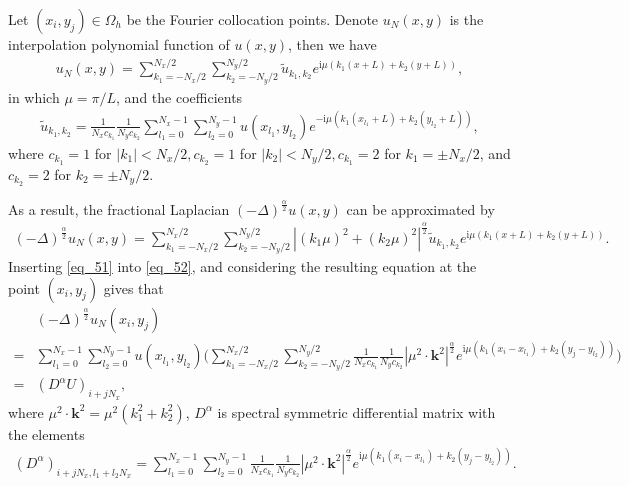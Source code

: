 \documentclass[preprint,compress,3p,10pt,fleqn]{elsarticle}
\numberwithin{equation}{section}
\begin{document}
Let $\left(x_{i}, y_{j}\right) \in \Omega_{h}$ be the Fourier collocation points. Denote $u_{N}(x, y)$ is the interpolation polynomial function of $u(x, y)$, then we have
\begin{align}\label{eq_50}
u_{N}(x, y)=\sum_{k_{1}=-N_{x} / 2}^{N_{x} / 2} \sum_{k_{2}=-N_{y} / 2}^{N_{y} / 2} \tilde{u}_{k_{1}, k_{2}} e^{\mathrm{i}\mu\left( k_{1} (x+L)+k_{2}(y+L)\right)},
\end{align}
in which $\mu={\pi}/{L}$, and the coefficients
\begin{align}\label{eq_51}
\tilde{u}_{k_{1}, k_{2}}=\frac{1}{N_{x} c_{k_{1}}} \frac{1}{N_{y} c_{k_{2}}} \sum_{l_1=0}^{N_{x}-1} \sum_{l_2=0}^{N_{y}-1} u(x_{l_1}, y_{l_2}) e^{-\mathrm{i}\mu\left( k_{1}(x_{l_1}+L)+k_{2}(y_{l_2}+L)\right)},
\end{align}
where $c_{k_{1}}=1$ for $\left|k_{1}\right|<N_{x}/2, c_{k_{2}}=1$ for $\left|k_{2}\right|<N_{y}/2, c_{k_{1}}=2$ for $k_{1}=\pm N_{x}/2$, and $c_{k_{2}}=2$ for $k_{2}=\pm N_{y}/2$.
	
As a result, the fractional Laplacian $(-\Delta)^{\frac{\alpha}{2}} u(x, y)$ can be approximated by
\begin{align}\label{eq_52}
(-\Delta)^{\frac{\alpha}{2}} u_{N}\left(x, y\right)=\sum\limits_{k_{1}=-N_{x} / 2}^{N_{x} / 2} \sum\limits_{k_{2}=-N_{y} / 2}^{N_{y} / 2}\left|\left(k_{1} \mu\right)^{2}+\left(k_{2} \mu\right)^{2}\right|^{\frac{\alpha}{2}} \tilde{u}_{k_{1}, k_{2}} e^{\mathrm{i}\mu\left( k_{1} (x+L)+k_{2}(y+L)\right)}.
\end{align}
Inserting \eqref{eq_51} into \eqref{eq_52}, and considering the resulting equation at the point $(x_i,y_j)$ gives that
\begin{align}
&(-\Delta)^{\frac{\alpha}{2}} u_{N}\left(x_{i}, y_{j}\right)\nonumber\\
=&\sum\limits_{l_{1}=0}^{N_{x}-1} \sum\limits_{l_{2}=0}^{N_{y}-1}u(x_{l_{1}}, y_{l_{2}})\Big(\sum\limits_{k_{1}=-N_{x} / 2}^{N_{x} / 2} \sum\limits_{k_{2}=-N_{y} / 2}^{N_{y} / 2} \frac{1}{N_{x} c_{k_{1}}} \frac{1}{N_{y} c_{k_{2}}}\left|\mu^{2} \cdot \mathbf{k}^{2}\right|^{\frac{\alpha}{2}} e^{\mathrm{i} \mu\left(k_{1}\left(x_{i}-x_{l_{1}}\right)+k_{2}\left(y_{j}-y_{l_{2}}\right)\right)}\Big)\nonumber\\
=&\left(D^{\alpha}U\right)_{i+j N_{x}},\label{eq_53}
\end{align}
where $\mu^{2} \cdot \mathbf{k}^{2}=\mu^{2}\left(k_{1}^{2}+k_{2}^{2}\right)$, $D^{\alpha}$ is spectral symmetric differential matrix with the elements
\begin{align}\label{eq_54}
\left(D^{\alpha}\right)_{i+j N_{x}, l_{1}+l_{2} N_{x}}=\sum\limits_{l_{1}=0}^{N_{x}-1} \sum\limits_{l_{2}=0}^{N_{y}-1}\frac{1}{N_{x} c_{k_{1}}} \frac{1}{N_{y} c_{k_{2}}}\left|\mu^{2} \cdot \mathbf{k}^{2}\right|^{\frac{\alpha}{2}} e^{\mathrm{i}\mu\left(k_{1}\left(x_{i}-x_{l_{1}}\right)+k_{2}\left(y_{j}-y_{l_{2}}\right)\right)}.
\end{align}
	
\end{document}
